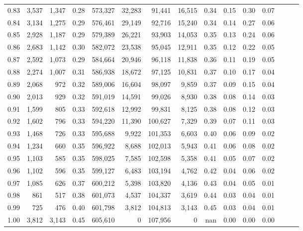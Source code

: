 \begin{tabular}{rrrrrrrrrrrrrrr}
0.83 &   3,537 &  1,347 &  0.28 &  573,327 &   32,283 &   91,441 &   16,515 &  0.34 &  0.15 &  0.30 &      0.07 \\
0.84 &   3,134 &  1,275 &  0.29 &  576,461 &   29,149 &   92,716 &   15,240 &  0.34 &  0.14 &  0.27 &      0.06 \\
0.85 &   2,928 &  1,187 &  0.29 &  579,389 &   26,221 &   93,903 &   14,053 &  0.35 &  0.13 &  0.24 &      0.06 \\
0.86 &   2,683 &  1,142 &  0.30 &  582,072 &   23,538 &   95,045 &   12,911 &  0.35 &  0.12 &  0.22 &      0.05 \\
0.87 &   2,592 &  1,073 &  0.29 &  584,664 &   20,946 &   96,118 &   11,838 &  0.36 &  0.11 &  0.19 &      0.05 \\
0.88 &   2,274 &  1,007 &  0.31 &  586,938 &   18,672 &   97,125 &   10,831 &  0.37 &  0.10 &  0.17 &      0.04 \\
0.89 &   2,068 &    972 &  0.32 &  589,006 &   16,604 &   98,097 &    9,859 &  0.37 &  0.09 &  0.15 &      0.04 \\
0.90 &   2,013 &    929 &  0.32 &  591,019 &   14,591 &   99,026 &    8,930 &  0.38 &  0.08 &  0.14 &      0.03 \\
0.91 &   1,599 &    805 &  0.33 &  592,618 &   12,992 &   99,831 &    8,125 &  0.38 &  0.08 &  0.12 &      0.03 \\
0.92 &   1,602 &    796 &  0.33 &  594,220 &   11,390 &  100,627 &    7,329 &  0.39 &  0.07 &  0.11 &      0.03 \\
0.93 &   1,468 &    726 &  0.33 &  595,688 &    9,922 &  101,353 &    6,603 &  0.40 &  0.06 &  0.09 &      0.02 \\
0.94 &   1,234 &    660 &  0.35 &  596,922 &    8,688 &  102,013 &    5,943 &  0.41 &  0.06 &  0.08 &      0.02 \\
0.95 &   1,103 &    585 &  0.35 &  598,025 &    7,585 &  102,598 &    5,358 &  0.41 &  0.05 &  0.07 &      0.02 \\
0.96 &   1,102 &    596 &  0.35 &  599,127 &    6,483 &  103,194 &    4,762 &  0.42 &  0.04 &  0.06 &      0.02 \\
0.97 &   1,085 &    626 &  0.37 &  600,212 &    5,398 &  103,820 &    4,136 &  0.43 &  0.04 &  0.05 &      0.01 \\
0.98 &     861 &    517 &  0.38 &  601,073 &    4,537 &  104,337 &    3,619 &  0.44 &  0.03 &  0.04 &      0.01 \\
0.99 &     725 &    476 &  0.40 &  601,798 &    3,812 &  104,813 &    3,143 &  0.45 &  0.03 &  0.04 &      0.01 \\
1.00 &   3,812 &  3,143 &  0.45 &  605,610 &        0 &  107,956 &        0 &   nan &  0.00 &  0.00 &      0.00 \\
\bottomrule
\end{tabular}
